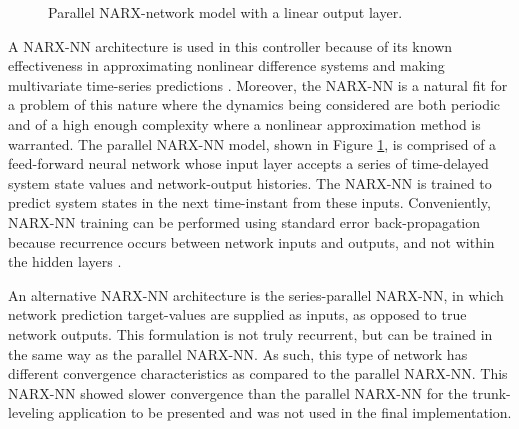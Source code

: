 			\begin{figure}[h!]
				\centering
				\caption{Parallel NARX-network model with a linear output layer.}
				\label{fig::narx_net}
			\end{figure}

		A NARX-NN architecture is used in this controller because of  its known effectiveness in approximating nonlinear difference systems and making multivariate time-series predictions \cite{Tsungnan1996,ChenBillings1990,Hihi1996,Billings2013}. Moreover, the NARX-NN is a natural fit for a problem of this nature where the dynamics being considered are both periodic and of a high enough complexity where a nonlinear approximation method is warranted. The parallel NARX-NN model, shown in Figure \ref{fig::narx_net}, is comprised of a feed-forward neural network whose input layer accepts a series of time-delayed system state values and network-output histories. The NARX-NN is trained to predict system states in the next time-instant from these inputs. Conveniently, NARX-NN training can be performed using standard error back-propagation because recurrence occurs between network inputs and outputs, and not within the hidden layers \cite{Nelles2001}. 

		An alternative NARX-NN architecture is the series-parallel NARX-NN, in which network prediction target-values are supplied as inputs, as opposed to true network outputs. This formulation is not truly recurrent, but can be trained in the same way as the parallel NARX-NN. As such, this type of network has different convergence characteristics as compared to the parallel NARX-NN. This NARX-NN showed slower convergence than the parallel NARX-NN for the trunk-leveling application to be presented and was not used in the final implementation.

